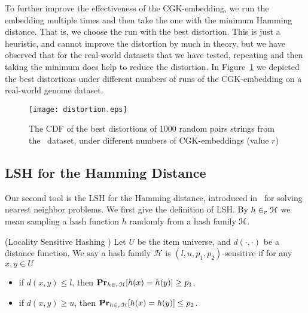  
To further improve the effectiveness of the CGK-embedding, we run the embedding multiple times and then take the one with the minimum Hamming distance. That is, we choose the run with the best distortion.  This is just a heuristic, and cannot improve the distortion by much in theory, but we have observed that for the real-world datasets that we have tested, repeating and then taking the minimum does help to reduce the distortion. In Figure~\ref{fig:CGK-distortion} we depicted the best distortions under different numbers of runs of the CGK-embedding on a real-world genome dataset.

\begin{figure}[t]
\centering
\texttt{[image: distortion.eps]}
\caption{The CDF of the best distortions of 1000 random pairs strings from the \genoa\ dataset, under different numbers of CGK-embeddings (value $r$)}
\label{fig:CGK-distortion}
\end{figure}


\subsection{LSH for the Hamming Distance}
\label{sec:LSH}

Our second tool is the LSH for the Hamming distance, introduced in~\cite{IM98,GIM99} for solving nearest neighbor problems.  We first give the definition of LSH.  By $h \in_r \mathcal{H}$ we mean sampling a hash function $h$ randomly from a hash family $\mathcal{H}$. 

\begin{definition}(Locality Sensitive Hashing \cite{GIM99})
Let $U$ be the item universe, and $d(\cdot,\cdot)$ be a distance function. We say a hash family $\mathcal{H}$ is $(l, u, p_1,p_2)$-sensitive if for any $x, y \in U$
\begin{itemize}
\item if $d(x, y)\le l$, then $\mathbf{Pr}_{h\in_r \mathcal{H}}[h(x) = h(y)] \ge p_1$,
\item if $d(x, y)\ge u$, then $\mathbf{Pr}_{h\in_r \mathcal{H}}[h(x) = h(y)] \le p_2$.
\end{itemize}
\end{definition}


